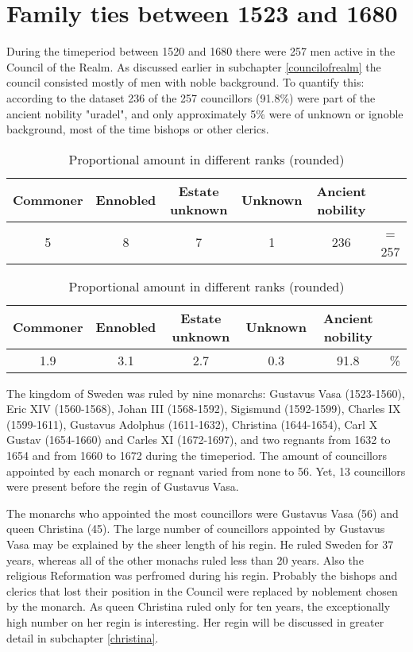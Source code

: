 \section{Family ties between 1523 and 1680}
During the timeperiod between 1520 and 1680 there were 257 men active in the Council of the Realm. As discussed earlier in subchapter \ref{councilofrealm} the council consisted mostly of men with noble background. To quantify this: according to the dataset 236 of the 257 councillors (91.8\%) were part of the ancient nobility "uradel", and only approximately 5\% were of unknown or ignoble background, most of the time bishops or other clerics.  

\begin{table}
	\caption{Absolute amount in different ranks}
	\centering
	\begin{tabular}{cccccc}
		\hline
		Commoner & Ennobled & Estate unknown & Unknown & Ancient nobility & \\
		\hline
		5 & 8 & 7 & 1 & 236 & = 257 \\
		\hline
	\end{tabular}
	\caption{Proportional amount in different ranks (rounded)}
	\centering
	\begin{tabular}{cccccc}
		\hline
	    Commoner & Ennobled & Estate unknown & Unknown & Ancient nobility & \\
	    \hline
	    1.9 & 3.1 & 2.7 & 0.3 & 91.8 & \% \\
	\end{tabular}
\end{table}

The kingdom of Sweden was ruled by nine monarchs: Gustavus Vasa (1523-1560), Eric XIV (1560-1568), Johan III (1568-1592), Sigismund (1592-1599), Charles IX (1599-1611), Gustavus Adolphus (1611-1632), Christina (1644-1654), Carl X Gustav (1654-1660) and Carles XI (1672-1697), and two regnants from 1632 to 1654 and from 1660 to 1672 during the timeperiod. The amount of councillors appointed by each monarch or regnant varied from none to 56. Yet, 13 councillors were present before the regin of Gustavus Vasa.

The monarchs who appointed the most councillors were Gustavus Vasa (56) and queen Christina (45). The large number of councillors appointed by Gustavus Vasa may be explained by the sheer length of his regin. He ruled Sweden for 37 years, whereas all of the other monachs ruled less than 20 years. Also the religious Reformation was perfromed during his regin. Probably the bishops and clerics that lost their position in the Council were replaced by noblement chosen by the monarch. As queen Christina ruled only for ten years, the exceptionally high number on her regin is interesting. Her regin will be discussed in greater detail in subchapter \ref{christina}. 

